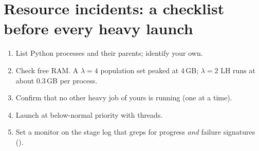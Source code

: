 \section{Resource incidents: a checklist before every heavy launch}
\begin{enumerate}
\item List Python processes and their parents; identify your own.
\item Check free RAM. A $\lambda=4$ population set peaked at 4\,GB; $\lambda=2$ LH runs at about 0.3\,GB per process.
\item Confirm that no other heavy job of yours is running (one at a time).
\item Launch at below-normal priority with  threads.
\item Set a monitor on the stage log that greps for progress \emph{and} failure signatures ().
\end{enumerate}
